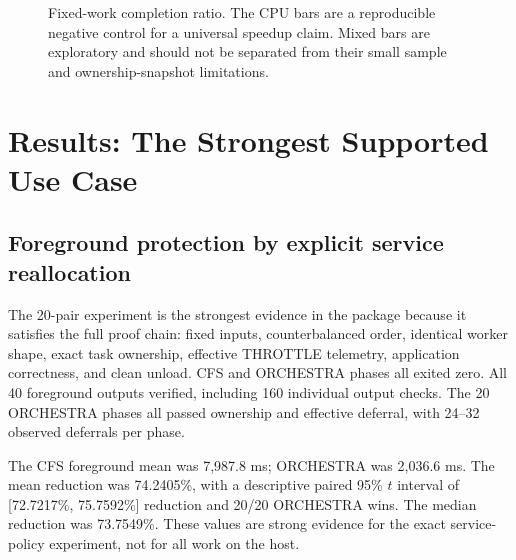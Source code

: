 \documentclass[10pt,letterpaper,twocolumn]{article}
\begin{document}
\begin{figure}[t]
\centering
{}
\caption{Fixed-work completion ratio. The CPU bars are a reproducible negative control for a universal speedup claim. Mixed bars are exploratory and should not be separated from their small sample and ownership-snapshot limitations.}
\label{fig:fixed-ratio}
\end{figure}

\section{Results: The Strongest Supported Use Case}

\subsection{Foreground protection by explicit service reallocation}

The 20-pair experiment is the strongest evidence in the package because it satisfies the full proof chain: fixed inputs, counterbalanced order, identical worker shape, exact task ownership, effective THROTTLE telemetry, application correctness, and clean unload. CFS and ORCHESTRA phases all exited zero. All 40 foreground outputs verified, including 160 individual output checks. The 20 ORCHESTRA phases all passed ownership and effective deferral, with 24--32 observed deferrals per phase.

The CFS foreground mean was 7,987.8 ms; ORCHESTRA was 2,036.6 ms. The mean reduction was 74.2405\%, with a descriptive paired 95\% $t$ interval of [72.7217\%, 75.7592\%] reduction and 20/20 ORCHESTRA wins. The median reduction was 73.7549\%. These values are strong evidence for the exact service-policy experiment, not for all work on the host.
\end{document}
